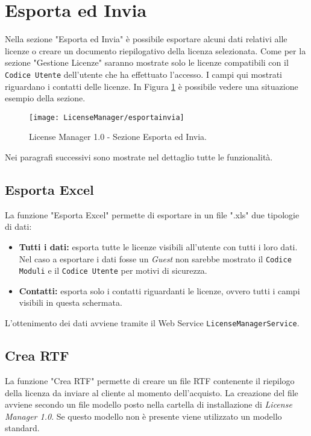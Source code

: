 
\section{Esporta ed Invia}

Nella sezione "Esporta ed Invia" è possibile esportare alcuni dati relativi alle licenze o creare un documento riepilogativo della licenza selezionata. Come per la sezione "Gestione Licenze" saranno mostrate solo le licenze compatibili con il \texttt{Codice Utente} dell’utente che ha effettuato l'accesso. I campi qui mostrati riguardano i contatti delle licenze.
In Figura \ref{espinv} è possibile vedere una situazione esempio della sezione.

\begin{figure}[!h] 
    \centering 
    \texttt{[image: LicenseManager/esportainvia]} 
    \caption{License Manager 1.0 - Sezione Esporta ed Invia.}
\label{espinv}
\end{figure}

Nei paragrafi successivi sono mostrate nel dettaglio tutte le funzionalità. 

\subsection{Esporta Excel}

La funzione "Esporta Excel" permette di esportare in un file ".xls" due tipologie di dati:
\begin{itemize}

\item \textbf{Tutti i dati:} esporta tutte le licenze visibili all’utente con tutti i loro dati. Nel caso a esportare i dati fosse un \textit{Guest} non sarebbe mostrato il \texttt{Codice Moduli} e il \texttt{Codice Utente} per motivi di sicurezza.
\item \textbf{Contatti:} esporta solo i contatti riguardanti le licenze, ovvero tutti i campi visibili in questa schermata.

\end{itemize}

L'ottenimento dei dati avviene tramite il Web Service \texttt{LicenseManagerService}.

\subsection{Crea RTF}
\label{creartf}
La funzione "Crea RTF" permette di creare un file RTF contenente il riepilogo della licenza da inviare al cliente al momento dell’acquisto. La creazione del file avviene secondo un file modello posto nella cartella di installazione di \textit{License Manager 1.0}. Se questo modello non è presente viene utilizzato un modello standard.

